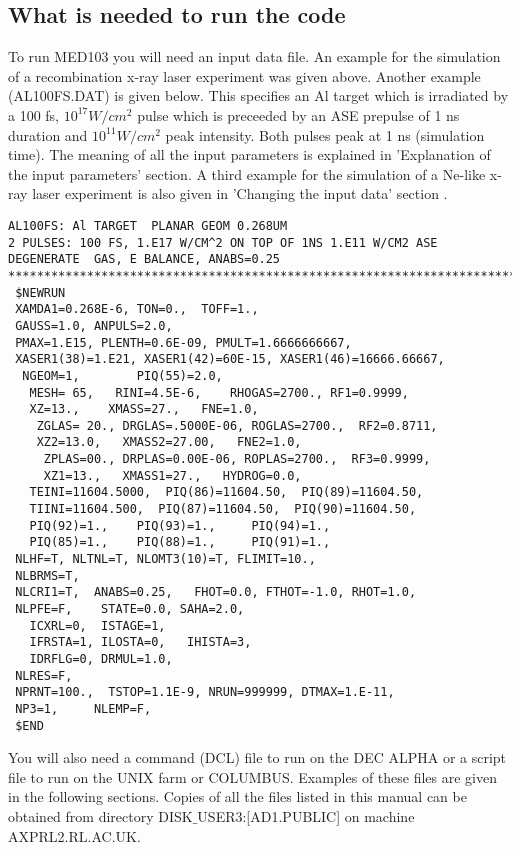 \subsection{What is needed to run the code}
 
To run MED103 you will need an input data file. An example for the simulation
of a recombination x-ray laser experiment was given above. Another example
(AL100FS.DAT) is given below. 
This specifies an Al target which is irradiated by a 100 fs, $10^{17} W/cm^2$ pulse which is
preceeded by an ASE prepulse of 1 ns duration and $10^{11} W/cm^2$ peak intensity. Both pulses peak at 
1 ns (simulation time). The meaning of all
the input parameters is explained in 'Explanation of the input parameters' section. A third example 
for the simulation of a Ne-like x-ray laser experiment is also given in 'Changing the input data' section .

\begin{verbatim}
AL100FS: Al TARGET  PLANAR GEOM 0.268UM
2 PULSES: 100 FS, 1.E17 W/CM^2 ON TOP OF 1NS 1.E11 W/CM2 ASE
DEGENERATE  GAS, E BALANCE, ANABS=0.25
************************************************************************
 $NEWRUN
 XAMDA1=0.268E-6, TON=0.,  TOFF=1.,
 GAUSS=1.0, ANPULS=2.0,
 PMAX=1.E15, PLENTH=0.6E-09, PMULT=1.6666666667,
 XASER1(38)=1.E21, XASER1(42)=60E-15, XASER1(46)=16666.66667,
  NGEOM=1,        PIQ(55)=2.0,
   MESH= 65,   RINI=4.5E-6,    RHOGAS=2700., RF1=0.9999,
   XZ=13.,    XMASS=27.,   FNE=1.0,
    ZGLAS= 20., DRGLAS=.5000E-06, ROGLAS=2700.,  RF2=0.8711,
    XZ2=13.0,   XMASS2=27.00,   FNE2=1.0,
     ZPLAS=00., DRPLAS=0.00E-06, ROPLAS=2700.,  RF3=0.9999,
     XZ1=13.,   XMASS1=27.,   HYDROG=0.0,
   TEINI=11604.5000,  PIQ(86)=11604.50,  PIQ(89)=11604.50,
   TIINI=11604.500,  PIQ(87)=11604.50,  PIQ(90)=11604.50,
   PIQ(92)=1.,    PIQ(93)=1.,     PIQ(94)=1.,
   PIQ(85)=1.,    PIQ(88)=1.,     PIQ(91)=1.,
 NLHF=T, NLTNL=T, NLOMT3(10)=T, FLIMIT=10.,
 NLBRMS=T, 
 NLCRI1=T,  ANABS=0.25,   FHOT=0.0, FTHOT=-1.0, RHOT=1.0,
 NLPFE=F,    STATE=0.0, SAHA=2.0,
   ICXRL=0,  ISTAGE=1,
   IFRSTA=1, ILOSTA=0,   IHISTA=3,
   IDRFLG=0, DRMUL=1.0,
 NLRES=F,
 NPRNT=100.,  TSTOP=1.1E-9, NRUN=999999, DTMAX=1.E-11,
 NP3=1,     NLEMP=F,
 $END
\end{verbatim}
 
You will also need a  command  (DCL) file to run on the DEC ALPHA 
or  a script file to run on the 
UNIX farm or COLUMBUS. Examples of these files are given in the following  sections.
Copies of all the files  listed in this manual can be obtained from directory DISK$\_$USER3:[AD1.PUBLIC]
on machine AXPRL2.RL.AC.UK.

